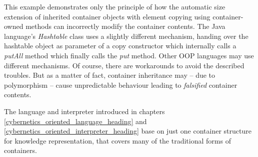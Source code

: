 This example demonstrates only the principle of how the automatic size
extension of inherited container objects with element copying using
container-owned methods can incorrectly modify the container contents. The Java
language's \emph{Hashtable} class uses a slightly different mechanism, handing
over the hashtable object as parameter of a copy constructor which internally
calls a \emph{putAll} method which finally calls the \emph{put} method. Other
OOP languages may use different mechanisms. Of course, there are workarounds to
avoid the described troubles. But as a matter of fact, container inheritance
may -- due to polymorphism -- cause unpredictable behaviour leading to
\emph{falsified} container contents.

The language and interpreter introduced in chapters
\ref{cybernetics_oriented_language_heading} and
\ref{cybernetics_oriented_interpreter_heading} base on just one container
structure for knowledge representation, that covers many of the traditional
forms of containers.
